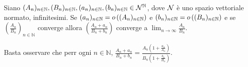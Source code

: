 \begin{Theorem}
	 Siano $(A_n)_{n \in \mathbb{N}}, (B_n)_{n \in \mathbb{N}}, (a_n)_{n \in \mathbb{N}}, (b_n)_{n \in \mathbb{N}} \in \mathcal{N}^\mathbb{N}$, dove $\mathcal{N}$ \`e uno spazio vettoriale normato, infinitesimi. Se $(a_n)_{n \in \mathbb{N}} = o \left ( (A_n)_{n \in \mathbb{N}} \right )$ e $(b_n)_{n \in \mathbb{N}} = o \left ( (B_n)_{n \in \mathbb{N}} \right )$ e se $\left ( \frac{A_n}{B_n} \right )_{n \in \mathbb{N}}$ converge allora $\left ( \frac{A_n + a_n}{B_n + b_n} \right )$ converge a $\lim_{n \rightarrow \infty} \frac{A_n}{B_n}$.
\end{Theorem}
\Proof Basta osservare che perr ogni $n \in \mathbb{N}$, $\frac{A_n + a_n}{B_n + b_n} = \frac{A_n \left ( 1 + \frac{a_n}{A_n} \right )}{B_n \left ( 1 + \frac{b_n}{B_n} \right )}$. \EndProof

